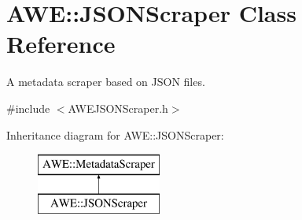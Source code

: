 \hypertarget{class_a_w_e_1_1_j_s_o_n_scraper}{\section{A\-W\-E\-:\-:J\-S\-O\-N\-Scraper Class Reference}
\label{class_a_w_e_1_1_j_s_o_n_scraper}
}


A metadata scraper based on J\-S\-O\-N files.  




{\ttfamily \#include $<$A\-W\-E\-J\-S\-O\-N\-Scraper.\-h$>$}

Inheritance diagram for A\-W\-E\-:\-:J\-S\-O\-N\-Scraper\-:\begin{figure}[H]
\begin{center}
\leavevmode
\includegraphics[height=2.000000cm]{class_a_w_e_1_1_j_s_o_n_scraper}
\end{center}
\end{figure}

